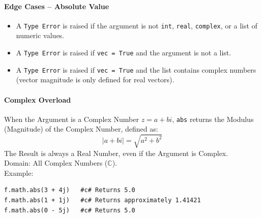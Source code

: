 \paragraph{Edge Cases -- Absolute Value}
\begin{itemize}
\item A \texttt{Type Error} is raised if the argument is not \texttt{int}, \texttt{real}, \texttt{complex}, or a list of numeric values.
\item A \texttt{Type Error} is raised if \texttt{vec = True} and the argument is not a list.
\item A \texttt{Type Error} is raised if \texttt{vec = True} and the list contains complex numbers (vector magnitude is only defined for real vectors).
\end{itemize}

\paragraph{Complex Overload}
When the Argument is a Complex Number $z = a + bi$, \texttt{abs} returns the Modulus (Magnitude) of the Complex Number, defined as:
\[
\lvert a + bi \rvert = \sqrt{a^2 + b^2}
\]
The Result is always a Real Number, even if the Argument is Complex.\\
Domain: All Complex Numbers ($\mathbb{C}$).\\
Example:
\begin{verbatim}
f.math.abs(3 + 4j)   #c# Returns 5.0
f.math.abs(1 + 1j)   #c# Returns approximately 1.41421
f.math.abs(0 - 5j)   #c# Returns 5.0
\end{verbatim}

